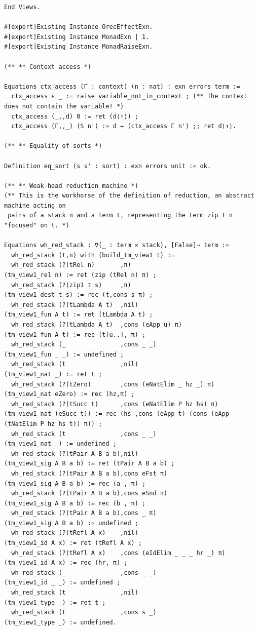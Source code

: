 \documentclass[10pt,a4paper]{amsart}
\begin{document}
\begin{lstlisting}
End Views.

#[export]Existing Instance OrecEffectExn.
#[export]Existing Instance MonadExn | 1.
#[export]Existing Instance MonadRaiseExn.

(** ** Context access *)

Equations ctx_access (Γ : context) (n : nat) : exn errors term :=
  ctx_access ε _ := raise variable_not_in_context ; (** The context does not contain the variable! *)
  ctx_access (_,,d) 0 := ret (d⟨↑⟩) ;
  ctx_access (Γ,,_) (S n') := d ← (ctx_access Γ n') ;; ret d⟨↑⟩.

(** ** Equality of sorts *)

Definition eq_sort (s s' : sort) : exn errors unit := ok.

(** ** Weak-head reduction machine *)
(** This is the workhorse of the definition of reduction, an abstract machine acting on
 pairs of a stack π and a term t, representing the term zip t π "focused" on t. *)

Equations wh_red_stack : ∇(_ : term × stack), [False]⇒ term :=
  wh_red_stack (t,π) with (build_tm_view1 t) :=
  wh_red_stack (?(tRel n)       ,π)                           (tm_view1_rel n) := ret (zip (tRel n) π) ;
  wh_red_stack (?(zip1 t s)     ,π)                           (tm_view1_dest t s) := rec (t,cons s π) ;
  wh_red_stack (?(tLambda A t)  ,nil)                         (tm_view1_fun A t) := ret (tLambda A t) ;
  wh_red_stack (?(tLambda A t)  ,cons (eApp u) π)             (tm_view1_fun A t) := rec (t[u..], π) ;
  wh_red_stack (_               ,cons _ _)                    (tm_view1_fun _ _) := undefined ;
  wh_red_stack (t               ,nil)                         (tm_view1_nat _) := ret t ;
  wh_red_stack (?(tZero)        ,cons (eNatElim _ hz _) π)    (tm_view1_nat eZero) := rec (hz,π) ;
  wh_red_stack (?(tSucc t)      ,cons (eNatElim P hz hs) π)   (tm_view1_nat (eSucc t)) := rec (hs ,cons (eApp t) (cons (eApp (tNatElim P hz hs t)) π)) ;
  wh_red_stack (t               ,cons _ _)                    (tm_view1_nat _) := undefined ;
  wh_red_stack (?(tPair A B a b),nil)                         (tm_view1_sig A B a b) := ret (tPair A B a b) ;
  wh_red_stack (?(tPair A B a b),cons eFst π)                 (tm_view1_sig A B a b) := rec (a , π) ;
  wh_red_stack (?(tPair A B a b),cons eSnd π)                 (tm_view1_sig A B a b) := rec (b , π) ;
  wh_red_stack (?(tPair A B a b),cons _ π)                    (tm_view1_sig A B a b) := undefined ;
  wh_red_stack (?(tRefl A x)    ,nil)                         (tm_view1_id A x) := ret (tRefl A x) ;
  wh_red_stack (?(tRefl A x)    ,cons (eIdElim _ _ _ hr _) π) (tm_view1_id A x) := rec (hr, π) ;
  wh_red_stack (_               ,cons _ _)                    (tm_view1_id _ _) := undefined ;
  wh_red_stack (t               ,nil)                         (tm_view1_type _) := ret t ;
  wh_red_stack (t               ,cons s _)                    (tm_view1_type _) := undefined.



\end{lstlisting}
\end{document}
